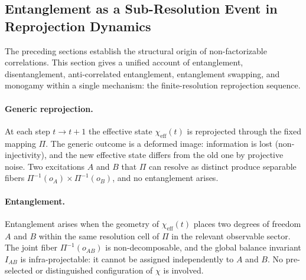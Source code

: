 \subsection{Entanglement as a Sub-Resolution Event in Reprojection Dynamics}
  \label{subsec:entanglement-critical-compression}

  The preceding sections establish the structural origin of non-factorizable
  correlations.
  This section gives a unified account of entanglement, disentanglement,
  anti-correlated entanglement, entanglement swapping, and monogamy within a
  single mechanism: the finite-resolution reprojection sequence.

  \paragraph{Generic reprojection.}
    At each step $t \to t+1$ the effective state $\chi_{\mathrm{eff}}(t)$ is
    reprojected through the fixed mapping $\Pi$.
    The generic outcome is a deformed image: information is lost
    (non-injectivity), and the new effective state differs from the old one by
    projective noise.
    Two excitations $A$ and $B$ that $\Pi$ can resolve as distinct produce
    separable fibers $\Pi^{-1}(o_A) \times \Pi^{-1}(o_B)$, and no entanglement
    arises.

  \paragraph{Entanglement.}
    Entanglement arises when the geometry of $\chi_{\mathrm{eff}}(t)$ places
    two degrees of freedom $A$ and $B$ within the same resolution cell of $\Pi$
    in the relevant observable sector.
    The joint fiber $\Pi^{-1}(o_{AB})$ is non-decomposable, and the global
    balance invariant $I_{AB}$ is infra-projectable: it cannot be assigned
    independently to $A$ and $B$.
    No pre-selected or distinguished configuration of $\chi$ is involved.

